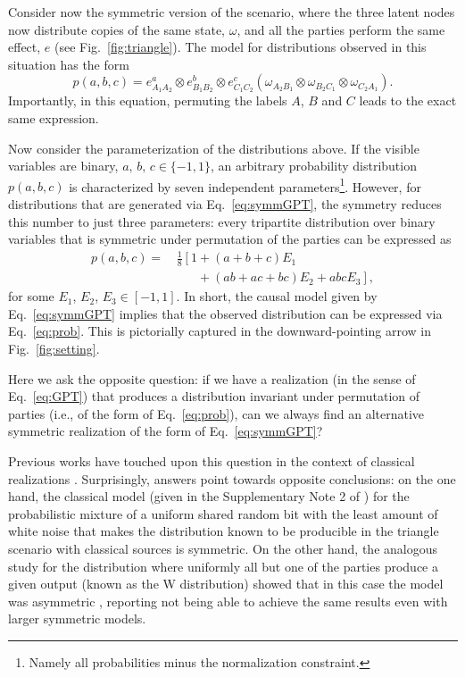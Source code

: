 \documentclass[aps,physrev,reprint,superscriptaddress,nofootinbib,twocolumn]{revtex4-2}
\begin{document}
Consider now the symmetric version of the scenario, where the three latent nodes now distribute copies of the same state, $\omega$, and all the parties perform the same effect, $e$ (see Fig.~\ref{fig:triangle}).
The model for distributions observed in this situation has the form
\begin{equation}
    p(a,b,c)\!=\!e^a_{A_1A_2}\otimes e^b_{B_1B_2}\otimes e^c_{C_1C_2} \!\left(\omega_{A_2B_1}\!\otimes\omega_{B_2C_1}\!\otimes\omega_{C_2A_1}\right)\!.
    \label{eq:symmGPT}
\end{equation}
Importantly, in this equation, permuting the labels $A$, $B$ and $C$ leads to the exact same expression.

Now consider the parameterization of the distributions above.
If the visible variables are binary, $a,\,b,\,c\in\{-1,1\}$, an arbitrary probability distribution $p(a,b,c)$ is characterized by seven independent parameters\footnote{Namely all probabilities minus the normalization constraint.}.
However, for distributions that are generated via Eq.~\eqref{eq:symmGPT}, the symmetry reduces this number to just three parameters: every tripartite distribution over binary variables that is symmetric under permutation of the parties can be expressed as
\begin{equation}
    \begin{aligned}
        p(a,b,c)=\,&\frac18\left[ 1+(a+b+c)E_1\right.\\
        &\quad\,\,\,\left.\,+(ab+ac+bc)E_2+abcE_3\right],
        \end{aligned}
    \label{eq:prob}
\end{equation}
for some $E_1$, $E_2$, $E_3\in[-1,1]$.
In short, the causal model given by Eq.~\eqref{eq:symmGPT} implies that the observed distribution can be expressed via Eq.~\eqref{eq:prob}.
This is pictorially captured in the downward-pointing arrow in Fig.~\ref{fig:setting}.

Here we ask the opposite question: if we have a realization (in the sense of Eq.~\eqref{eq:GPT}) that produces a distribution invariant under permutation of parties (i.e., of the form of Eq.~\eqref{eq:prob}), can we always find an alternative symmetric realization of the form of Eq.~\eqref{eq:symmGPT}?

Previous works have touched upon this question in the context of classical realizations \cite{gisin2020,silva2023}.
Surprisingly, answers point towards opposite conclusions: on the one hand, the classical model (given in the Supplementary Note 2 of \cite{gisin2020}) for the probabilistic mixture of a uniform shared random bit with the least amount of white noise that makes the distribution known to be producible in the triangle scenario with classical sources is symmetric.
On the other hand, the analogous study for the distribution where uniformly all but one of the parties produce a given output (known as the W distribution) showed that in this case the model was asymmetric \cite{silva2023}, reporting not being able to achieve the same results even with larger symmetric models.
\end{document}
